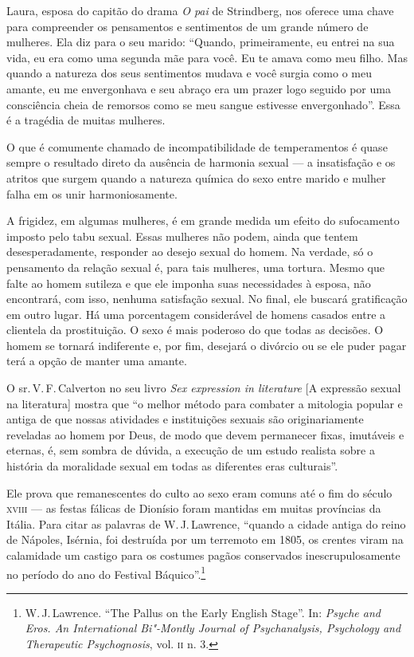 Laura, esposa do capitão do drama \emph{O pai} de Strindberg, nos
oferece uma chave para compreender os pensamentos e sentimentos de um
grande número de mulheres. Ela diz para o seu marido: ``Quando,
primeiramente, eu entrei na sua vida, eu era como uma segunda mãe para
você. Eu te amava como meu filho. Mas quando a natureza dos seus
sentimentos mudava e você surgia como o meu amante, eu me envergonhava
e seu abraço era um prazer logo seguido por uma consciência cheia de
remorsos como se meu sangue estivesse envergonhado''. Essa é a tragédia
de muitas mulheres.

\asterisc

O que é comumente chamado de incompatibilidade de temperamentos é quase
sempre o resultado direto da ausência de harmonia sexual --- a
insatisfação e os atritos que surgem quando a natureza química do sexo
entre marido e mulher falha em os unir harmoniosamente.

A frigidez, em algumas mulheres, é em grande medida um efeito do
sufocamento imposto pelo tabu sexual. Essas mulheres não podem,
ainda que tentem desesperadamente, responder ao desejo sexual do homem.
Na verdade, só o pensamento da relação sexual é, para tais mulheres, uma
tortura. Mesmo que falte ao homem sutileza e que ele imponha
suas necessidades à esposa, não encontrará, com isso, nenhuma satisfação sexual. No
final, ele buscará gratificação em outro lugar. Há uma porcentagem
considerável de homens casados entre a clientela da prostituição. O sexo
é mais poderoso do que todas as decisões. O homem se tornará indiferente
e, por fim, desejará o divórcio ou se ele puder pagar terá a opção de manter uma
amante.

\asterisc

O sr.\,V.\,F.\,Calverton no seu livro \emph{Sex expression in literature}
{[}A expressão sexual na literatura{]} mostra que ``o
melhor método para combater a mitologia popular e antiga de que nossas
atividades e instituições sexuais são originariamente reveladas ao homem por
Deus, de modo que devem permanecer fixas, imutáveis e eternas, é, sem
sombra de dúvida, a execução de um estudo realista sobre a história da
moralidade sexual em todas as diferentes eras culturais''.

Ele prova que remanescentes do culto ao sexo eram comuns até o fim do
século \textsc{xviii} --- as festas fálicas de Dionísio foram mantidas em muitas
províncias da Itália. Para citar as palavras de W.\,J.\,Lawrence, ``quando
a cidade antiga do reino de Nápoles, Isérnia, foi destruída por um
terremoto em 1805, os crentes viram na calamidade um castigo para os
costumes pagãos conservados inescrupulosamente no período do ano do
Festival Báquico''.\footnote{W.\,J.\,Lawrence. ``The Pallus on the Early
  English Stage''. In: \emph{Psyche and Eros. An International Bi"-Montly
  Journal of Psychanalysis, Psychology and Therapeutic Psychognosis},
  vol. \textsc{ii} n. 3.}

